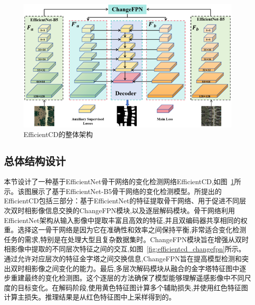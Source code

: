 \begin{figure}[!htb]
  \centering
  \includegraphics[width=\textwidth]{paper_figures/基于双时相遥感影像特征交互的变化检测算法研究/EfficientCD/efficientcd.png}
  \caption{EfficientCD的整体架构}
  \label{fig:efficientcd}
\end{figure}

\subsection{总体结构设计}

本节设计了一种基于EfficientNet骨干网络的变化检测网络EfficientCD,如图~\ref{fig:efficientcd}所示。该图展示了基于EfficientNet-B5骨干网络的变化检测模型。所提出的EfficientCD包括三部分：基于EfficientNet的特征提取骨干网络、用于促进不同层次双时相影像信息交换的ChangeFPN模块,以及逐层解码模块。骨干网络利用EfficientNet架构从输入影像中提取丰富且高效的特征,并且双编码器共享相同的权重。选择这一骨干网络是因为它在准确性和效率之间保持平衡,非常适合变化检测任务的需求,特别是在处理大型且复杂数据集时。ChangeFPN模块旨在增强从双时相影像中提取的不同层次特征之间的交互,如图~\ref{fig:efficientcd_changefpn}所示。通过允许对应层次的特征金字塔之间交换信息,ChangeFPN旨在提高模型检测和突出双时相影像之间变化的能力。最后,多层次解码模块从融合的金字塔特征图中逐步重建最终的变化检测图。这个逐层的方法确保了模型能够理解遥感影像中不同尺度的目标变化。在解码阶段,使用黄色特征图计算多个辅助损失,并使用红色特征图计算主损失。推理结果是从红色特征图中上采样得到的。

